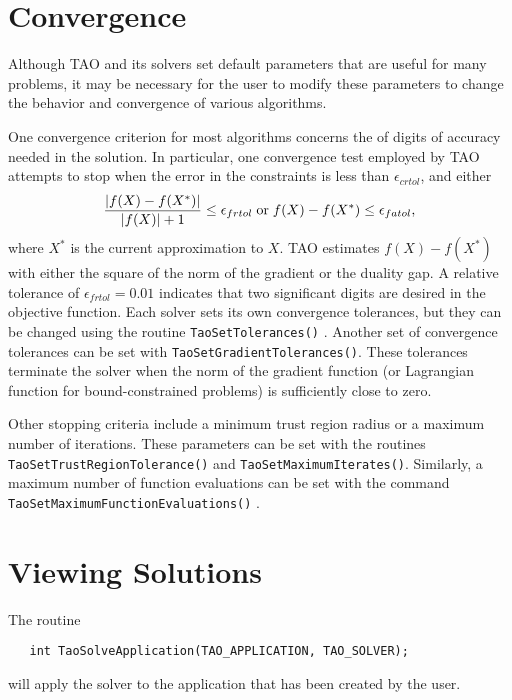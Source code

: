 \section{Convergence}\label{sec:customize}

Although TAO and its solvers set default parameters 
that are useful
for many problems, it may be necessary for the user to modify these
parameters to change the behavior and convergence of various algorithms.

One convergence criterion for most algorithms concerns the
of digits of accuracy needed in the solution.  In particular,
one convergence test employed by TAO attempts to stop when
the error in the constraints is less than $\epsilon_{crtol}$,
 and either
\[\frac{ |f(X) - f(X^*)|}{ |f(X)| + 1} \leq \epsilon_{frtol}
\;\textnormal{or}\;
f(X) - f(X^*)  \leq \epsilon_{fatol}, \]
where $X^*$ is the current approximation to $X$.
TAO estimates $f(X) - f(X^*)$ with either 
the square of the norm of the gradient or the duality gap.
A relative tolerance of $\epsilon_{frtol}=0.01$ indicates that two
significant digits are desired in the objective function.
Each solver sets its own  convergence tolerances, but they can
be changed using the routine
{\tt TaoSetTolerances()} . 
Another set of convergence tolerances can be set with 
{\tt TaoSetGradientTolerances()}.
These tolerances terminate the solver when the norm of the gradient function
(or Lagrangian function for bound-constrained problems)
is sufficiently close to zero.

Other stopping criteria include a minimum trust region radius or 
a maximum number of iterations.  These parameters can be set with
the routines {\tt TaoSetTrustRegionTolerance()}
and {\tt TaoSetMaximumIterates()}.
Similarly, a maximum number of function evaluations can be set 
with the command 
{\tt TaoSetMaximumFunctionEvaluations()}
.

\section{Viewing Solutions}

The routine
\begin{verbatim}
   int TaoSolveApplication(TAO_APPLICATION, TAO_SOLVER);
\end{verbatim}
\noindent
will apply the solver to the application that has been created by the user.

